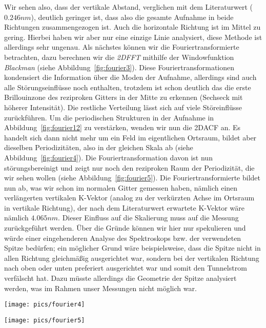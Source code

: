 Wir sehen also, dass der vertikale Abstand, verglichen mit dem Literaturwert ($0.246nm$), deutlich
geringer ist, dass also die gesamte Aufnahme in beide Richtungen zusammengezogen ist. 
Auch die horizontale Richtung ist im Mittel zu gering. Hierbei haben wir aber nur eine einzige
Linie analysiert, diese Methode ist allerdings sehr ungenau. 
Als nächstes können wir die Fouriertransformierte betrachten, dazu
berechnen wir die \textit{2DFFT} mithilfe der Windowfunktion \textit{Blackman} 
(siehe Abbildung~\ref{fig:fourier3}). Diese Fouriertransformationen kondensiert die Information
über die Moden der Aufnahme, allerdings sind auch alle Störungseinflüsse noch enthalten, trotzdem
ist schon deutlich das die erste Brillouinzone des reziproken Gitters in der Mitte zu erkennen
(Sechseck mit höherer Intensität). Die restliche Verteilung lässt sich auf viele Störeinflüsse
zurückführen. Um die periodischen Strukturen in der Aufnahme in Abbildung~\ref{fig:fourier12} zu
verstärken, wenden wir nun die 2DACF an. Es handelt sich dann nicht mehr um ein Feld im 
eigentlichen Ortsraum, bildet aber dieselben Periodizitäten, also in der gleichen Skala ab
(siehe Abbildung~\ref{fig:fourier4}). Die Fouriertransformation davon ist nun störungsbereinigt
und zeigt nur noch den reziproken Raum der Periodizität, die wir sehen wollen
(siehe Abbildung~\ref{fig:fourier5}). Die Fouriertransformierte bildet nun ab, was wir schon
im normalen Gitter gemessen haben, nämlich einen verlängerten vertikalen K-Vektor (analog
zu der verkürzten Achse im Ortsraum in vertikale Richtung), der nach dem Literaturwert 
erwartete K-Vektor wäre nämlich $4.065nm$. Dieser Einfluss auf die Skalierung
muss auf die Messung zurückgeführt werden. Über die Gründe können wir hier nur spekulieren und 
würde einer eingehenderen Analyse des Spektroskops bzw. der verwendeten Spitze bedürfen; 
ein möglicher Grund wäre beispielsweise, dass die Spitze nicht in allen Richtung gleichmäßig 
ausgerichtet war, sondern bei der vertikalen Richtung nach oben oder unten preferiert ausgerichtet
war und somit den Tunnelstrom verfälscht hat. Dazu müsste allerdings die Geometrie der Spitze 
analysiert werden, was im Rahmen unser Messungen nicht möglich war.
\begin{SCfigure}
    \caption{2DACF der Aufnahme (Abbildung~\ref{fig:fourier12}) mit
    subtrahiertem Hintergrund. }
    \texttt{[image: pics/fourier4]}
    \label{fig:fourier4}
\end{SCfigure}
\begin{SCfigure}
    \caption{Links: 2DACF der Aufnahme mit
        subtrahiertem Hintergrund (Abbildung~\ref{fig:fourier12}),
    Rechts: 2DFFT der autokorrelierten Aufnahme.}
    \texttt{[image: pics/fourier5]}
    \label{fig:fourier5}
\end{SCfigure}



\clearpage
